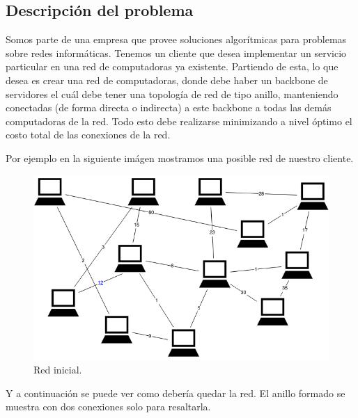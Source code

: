 \subsection{Descripci\'on del problema}

Somos parte de una empresa que provee soluciones algorítmicas para problemas sobre redes informáticas. Tenemos un cliente que desea implementar un servicio particular en una red de computadoras ya existente.
Partiendo de esta, lo que desea es crear una red de computadoras, donde debe haber un backbone de servidores el cuál debe tener una topología de red de tipo anillo, manteniendo conectadas (de forma directa o indirecta) a este backbone a todas las demás computadoras de la red.
Todo esto debe realizarse minimizando a nivel óptimo el costo total de las conexiones de la red.

Por ejemplo en la siguiente imágen mostramos una posible red de nuestro cliente.

\begin{figure}[H]
\begin{center}
\includegraphics[scale=.45]{./imagenes/ej3_ejemplo1.png}
\caption{Red inicial.}
\end{center}
\end{figure}

Y a continuación se puede ver como debería quedar la red. El anillo formado se muestra con dos conexiones solo para resaltarla.

